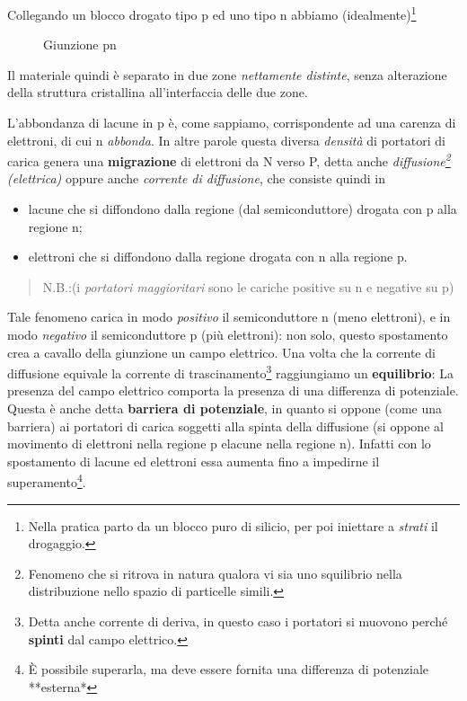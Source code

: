 \documentclass[
]{book}
\providecommand{\tightlist}{%
  \setlength{\itemsep}{0pt}\setlength{\parskip}{0pt}}
\begin{document}
Collegando un blocco drogato tipo p ed uno tipo n abbiamo
(idealmente)\footnote{Nella pratica parto da un blocco puro di silicio,
  per poi iniettare a \emph{strati} il drogaggio.}

\begin{figure}[H]
\centering
{}
\caption{Giunzione pn}
\end{figure}

Il materiale quindi è separato in due zone \emph{nettamente distinte},
senza alterazione della struttura cristallina all'interfaccia delle due
zone. \newline

L'abbondanza di lacune in p è, come sappiamo, corrispondente ad una
carenza di elettroni, di cui n \emph{abbonda}. In altre parole questa
diversa \emph{densità} di portatori di carica genera una
\textbf{migrazione} di elettroni da N verso P, detta anche
\emph{diffusione\footnote{Fenomeno che si ritrova in natura qualora vi
  sia uno squilibrio nella distribuzione nello spazio di particelle
  simili.} (elettrica)} oppure anche \emph{corrente di diffusione}, che
consiste quindi in

\begin{itemize}
\tightlist
\item
  lacune che si diffondono dalla regione (dal semiconduttore) drogata
  con p alla regione n;
\item
  elettroni che si diffondono dalla regione drogata con n alla regione
  p.
\end{itemize}

\begin{quote}
N.B.:(i \emph{portatori maggioritari} sono le cariche positive su n e
negative su p)
\end{quote}

Tale fenomeno carica in modo \emph{positivo} il semiconduttore n (meno
elettroni), e in modo \emph{negativo} il semiconduttore p (più
elettroni): non solo, questo spostamento crea a cavallo della giunzione
un campo elettrico. Una volta che la corrente di diffusione equivale la
corrente di trascinamento\footnote{Detta anche corrente di deriva, in
  questo caso i portatori si muovono perché \textbf{spinti} dal campo
  elettrico.} raggiungiamo un \textbf{equilibrio}: La presenza del campo
elettrico comporta la presenza di una differenza di potenziale. Questa è
anche detta \textbf{barriera di potenziale}, in quanto si oppone (come
una barriera) ai portatori di carica soggetti alla spinta della
diffusione (si oppone al movimento di elettroni nella regione p elacune
nella regione n). Infatti con lo spostamento di lacune ed elettroni essa
aumenta fino a impedirne il superamento\footnote{È possibile superarla,
  ma deve essere fornita una differenza di potenziale **esterna*}.
\end{document}
